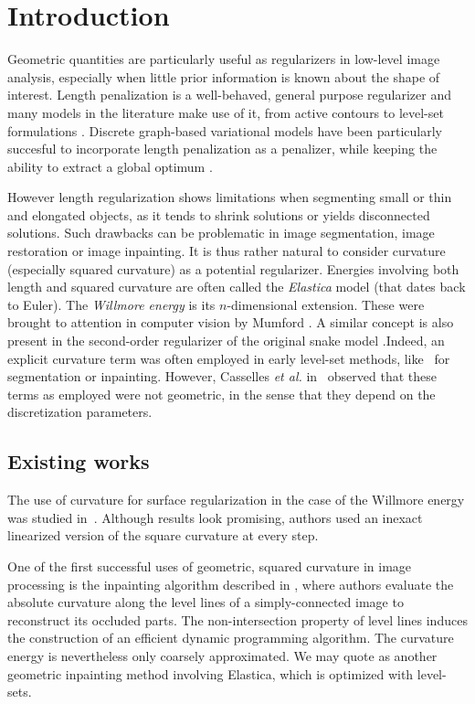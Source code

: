 \documentclass[smallextended]{svjour3}       %
\newcommand{\todo}[1]{{\textcolor{blue}{#1}}}
\begin{document}
\section{Introduction} %

Geometric quantities are particularly useful as regularizers in
low-level image analysis, especially when little prior information is
known about the shape of interest. Length penalization is a
well-behaved, general purpose regularizer and many models in the
literature make use of it, from active contours
\cite{casseles97geodesic} to level-set formulations
\cite{malladi1995image,malladi1995shape}. Discrete graph-based
variational models have been particularly succesful to incorporate
length penalization as a penalizer, while keeping the ability to
extract a global optimum \cite{boykov01graphcut,appleton05geodesic}.

However length regularization shows limitations when segmenting small
or thin and elongated objects, as it tends to shrink solutions or
yields disconnected solutions. Such drawbacks can be problematic in
image segmentation, image restoration or image inpainting. It is thus
rather natural to consider curvature (especially squared curvature) as
a potential regularizer. Energies involving both length and squared
curvature are often called the {\em Elastica} model (that dates back
to Euler). The {\em Willmore energy} is its $n$-dimensional
extension. These were brought to attention in computer vision by
Mumford \cite{mumford1994elastica}. A similar concept is also present
in the second-order regularizer of the original snake model
\cite{kass1988snakes}.Indeed, an explicit curvature term was often
employed in early level-set methods,
like~\cite{malladi1995image,malladi1995shape,ballester01filljoint} for
segmentation or inpainting. However, Casselles {\em et al.}
in~\cite{casseles97geodesic} observed that these terms as employed
were not geometric, in the sense that they depend on the
discretization parameters.

\subsection{Existing works}
The use of curvature for surface regularization in the case of the
Willmore energy was studied in~\cite{bobenko2005discrete}. Although
results look promising, authors used an inexact linearized version of
the square curvature at every step.

One of the first successful uses of geometric, squared curvature in
image processing is the inpainting algorithm described in
\cite{masnou98inpainting}, where authors evaluate the absolute
curvature along the level lines of a simply-connected image to
reconstruct its occluded parts. The non-intersection property of level
lines induces the construction of an efficient dynamic programming
algorithm. The curvature energy is nevertheless only coarsely
approximated. We may quote \cite{chan02elasticainpainting} as another
geometric inpainting method involving Elastica, which is optimized with
level-sets.
\end{document}
